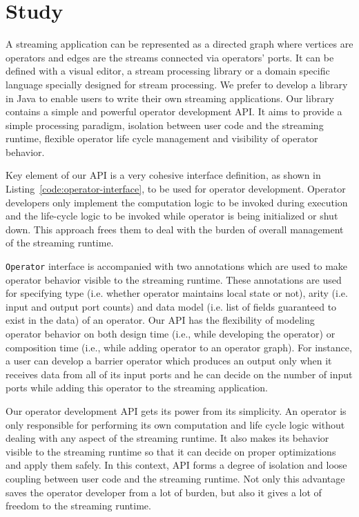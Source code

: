 \section{Study}\label{sec:study}

A streaming application can be represented as a directed graph where vertices are operators and edges are the streams connected via operators' ports. It can be defined with a visual editor, a stream processing library or a domain specific language specially designed for stream processing. We prefer to develop a library in Java to enable users to write their own streaming applications. Our library contains a simple and powerful operator development API. It aims to provide a simple processing paradigm, isolation between user code and the streaming runtime, flexible operator life cycle management and visibility of operator behavior. 

Key element of our API is a very cohesive interface definition, as shown in Listing~\ref{code:operator-interface}, to be used for operator development. Operator developers only implement the computation logic to be invoked during execution and the life-cycle logic to be invoked while operator is being initialized or shut down. This approach frees them to deal with the burden of overall management of the streaming runtime.

\texttt{Operator} interface is accompanied with two annotations which are used to make operator behavior visible to the streaming runtime. These annotations are used for specifying type (i.e. whether operator maintains local state or not), arity (i.e. input and output port counts) and data model (i.e. list of fields guaranteed to exist in the data) of an operator. Our API has the flexibility of modeling operator behavior on both design time (i.e., while developing the operator) or composition time (i.e., while adding operator to an operator graph). For instance, a user can develop a barrier operator which produces an output only when it receives data from all of its input ports and he can decide on the number of input ports while adding this operator to the streaming application. 

Our operator development API gets its power from its simplicity. An operator is only responsible for performing its own computation and life cycle logic without dealing with any aspect of the streaming runtime. It also makes its behavior visible to the streaming runtime so that it can decide on proper optimizations and apply them safely. In this context, API forms a degree of isolation and loose coupling between user code and the streaming runtime. Not only this advantage saves the operator developer from a lot of burden, but also it gives a lot of freedom to the streaming runtime.

